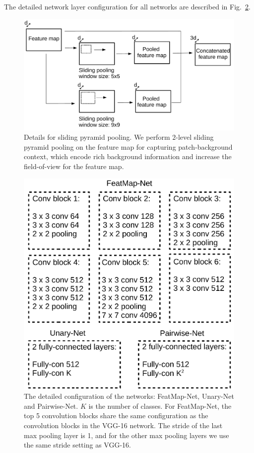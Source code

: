The detailed network layer configuration for all networks are described in Fig.~\ref{fig:network_conf}.
%









\begin{figure}[t]
	\center
	\includegraphics[width=1\linewidth]{./figs/pooling}
\caption{
Details for sliding pyramid pooling.
We perform $2$-level sliding pyramid pooling on the feature map for capturing patch-background context, 
which encode rich background information and increase the field-of-view for the feature map.
}
\label{fig:pooling}
\end{figure}






\begin{figure}[t]
	\center
	\includegraphics[width=.75\linewidth]{./figs/network_layers}
\caption{The detailed configuration of the networks: FeatMap-Net, Unary-Net and Pairwise-Net.
  $K$ is the number of classes.
  For FeatMap-Net, the top 5 convolution blocks share the same configuration
as the convolution blocks in the VGG-16 network. The stride of the last max pooling layer is 1, and
for the other max pooling layers we use the same stride setting as VGG-16.
}
\label{fig:network_conf}
\end{figure}







